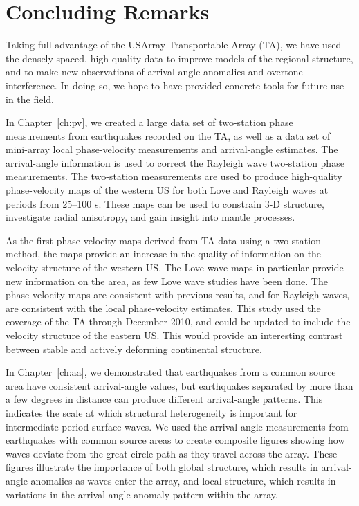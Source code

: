 \documentclass[12pt,oneside]{book}
\begin{document}
\singlespacing
\chapter{Concluding Remarks}
\label{ch:conclusions}
\doublespacing

\thispagestyle{fancy}

Taking full advantage of the USArray Transportable Array (TA), we have used the densely spaced, high-quality data to improve models of the regional structure, and to make new observations of arrival-angle anomalies and overtone interference. In doing so, we hope to have provided concrete tools for future use in the field. 

In Chapter~\ref{ch:pv}, we created a large data set of two-station phase measurements from earthquakes recorded on the TA, as well as a data set of mini-array local phase-velocity measurements and arrival-angle estimates. The arrival-angle information is used to correct the Rayleigh wave two-station phase measurements. The two-station measurements are used to produce high-quality phase-velocity maps of the western US for both Love and Rayleigh waves at periods from 25--100 s. These maps can be used to constrain 3\nobreakdash-D structure, investigate radial anisotropy, and gain insight into mantle processes. 

As the first phase-velocity maps derived from TA data using a two-station method, the maps provide an increase in the quality of information on the velocity structure of the western US. The Love wave maps in particular provide new information on the area, as few Love wave studies have been done. The phase-velocity maps are consistent with previous results, and for Rayleigh waves, are consistent with the local phase-velocity estimates. This study used the coverage of the TA through December 2010, and could be updated to include the velocity structure of the eastern US. This would provide an interesting contrast between stable and actively deforming continental structure. 

In Chapter~\ref{ch:aa}, we demonstrated that earthquakes from a common source area have consistent arrival-angle values, but earthquakes separated by more than a few degrees in distance can produce different arrival-angle patterns. This indicates the scale at which structural heterogeneity is important for intermediate-period surface waves. We used the arrival-angle measurements from earthquakes with common source areas to create composite figures showing how waves deviate from the great-circle path as they travel across the array. These figures illustrate the importance of both global structure, which results in arrival-angle anomalies as waves enter the array, and local structure, which results in variations in the arrival-angle-anomaly pattern within the array. 
\end{document}
